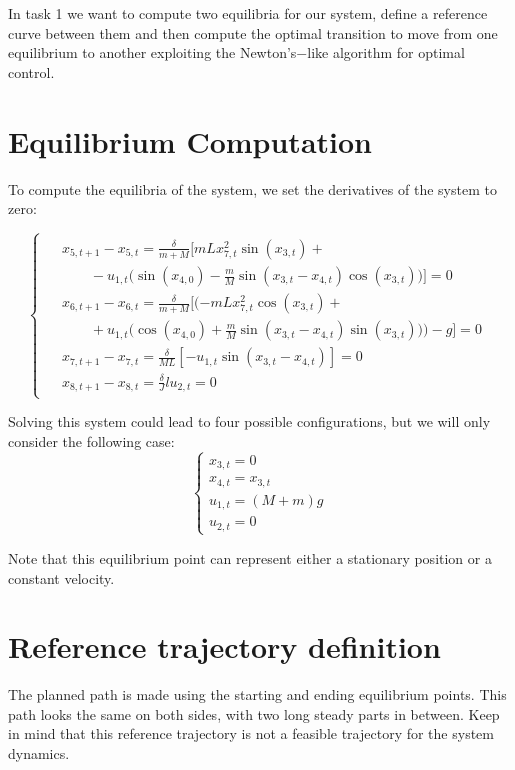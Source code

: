 In task 1 we want to compute two equilibria for our system, define a reference curve between them and then compute the optimal transition to move from one equilibrium to another exploiting the Newton's$-$like algorithm for optimal control.

\section{Equilibrium Computation}

To compute the equilibria of the system, we set the derivatives of the system to zero:


\[
\begin{cases}
\begin{aligned}
&x_{5,t+1} - x_{5,t} = \frac{\delta}{m+M} \bigl[m L x_{7,t}^2 \sin(x_{3,t}) +\\
&\qquad - u_{1,t} \bigl(\sin(x_{4,0}) - \frac{m}{M} \sin(x_{3,t} - x_{4,t}) \cos(x_{3,t})\bigr)\bigr] = 0 \\
&x_{6,t+1} - x_{6,t} = \frac{\delta}{m+M} \bigl[(-m L x_{7,t}^2 \cos(x_{3,t}) +\\
&\qquad + u_{1,t} \bigl(\cos(x_{4,0}) + \frac{m}{M} \sin(x_{3,t} - x_{4,t}) \sin(x_{3,t})\bigr)\bigr) - g] = 0 \\
&x_{7,t+1} - x_{7,t} = \frac{\delta}{M L} [-u_{1,t} \sin(x_{3,t} - x_{4,t})] = 0 \\
&x_{8,t+1} - x_{8,t} = \frac{\delta}{J} l u_{2,t} = 0
\end{aligned}
\end{cases}
\]



Solving this system could lead to four possible configurations, but we will only consider the following case:
\[
\begin{cases}
x_{3,t} = 0\\
x_{4,t} = x_{3,t}\\
u_{1,t} = (M + m) g\\
u_{2,t} = 0
\end{cases}
\]

Note that this equilibrium point can represent either a stationary position or a constant velocity.

\section{Reference trajectory definition}

The planned path is made using the starting and ending equilibrium points. This path looks the same on both sides, with two long steady parts in between. Keep in mind that this reference trajectory is not a feasible trajectory for the system dynamics.

